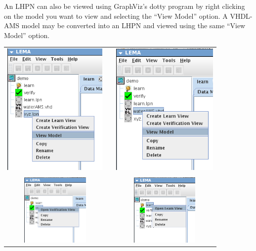 \documentclass[titlepage,11pt]{article}
\begin{document}
\noindent
An LHPN can also be viewed using 
GraphViz's
dotty program  by right clicking on the model you want to view and
selecting the ``View Model'' option. A VHDL-AMS model may be converted into an
LHPN and viewed using the same ``View Model'' option.

\begin{center}
\begin{tabular}{ccc}
\includegraphics[height=65mm]{screenshots/modLHPN} & &
\includegraphics[height=65mm]{screenshots/modVHDL} \\ \\
\includegraphics[height=35mm]{screenshots/modVerify} & &
\includegraphics[height=35mm]{screenshots/modLearnLema}
\end{tabular}
\end{center}
\end{document}
